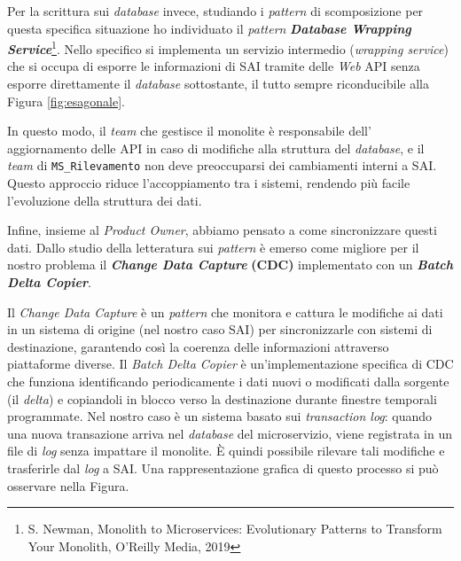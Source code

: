         \vspace{0.2 em}
        \noindent Per la scrittura sui \textit{database} invece, studiando i \textit{pattern} di scomposizione per questa specifica situazione ho individuato il \textit{pattern} \textbf{\textit{Database Wrapping Service}}\footnote{S. Newman, Monolith to Microservices: Evolutionary Patterns to Transform Your Monolith, O'Reilly Media, 2019}. Nello specifico si implementa un servizio intermedio (\textit{wrapping service}) che si occupa di esporre le informazioni di SAI tramite delle \textit{Web} API senza esporre direttamente il \textit{database} sottostante, il tutto sempre riconducibile alla Figura \ref{fig:esagonale}. 

        \vspace{0.2 em}
        \noindent In questo modo, il \textit{team} che gestisce il monolite è responsabile dell' aggiornamento delle API in caso di modifiche alla struttura del \textit{database}, e il \textit{team} di \texttt{MS\_Rilevamento} non deve preoccuparsi dei cambiamenti interni a SAI. Questo approccio riduce l'accoppiamento tra i sistemi, rendendo più facile l'evoluzione della struttura dei dati.

        \vspace{0.2 em}
        \noindent Infine, insieme al \textit{Product Owner}, abbiamo pensato a come sincronizzare questi dati. Dallo studio della letteratura sui \textit{pattern} è emerso come migliore per il nostro problema il \textit{\textbf{Change Data Capture}} \textbf{(CDC)} implementato con un \textbf{\textit{Batch Delta Copier}}. 
        
        
        \vspace{0.2 em} 
        \noindent Il \textit{Change Data Capture} è un \textit{pattern} che monitora e cattura le modifiche ai dati in un sistema di origine (nel nostro caso SAI) per sincronizzarle con sistemi di destinazione, garantendo così la coerenza delle informazioni attraverso piattaforme diverse. Il \textit{Batch Delta Copier} è un'implementazione specifica di CDC che funziona identificando periodicamente i dati nuovi o modificati dalla sorgente (il \textit{delta}) e copiandoli in blocco verso la destinazione durante finestre temporali programmate. Nel nostro caso è un sistema basato sui \textit{transaction log}: quando una nuova transazione arriva nel \textit{database} del microservizio, viene registrata in un file di \textit{log} senza impattare il monolite. È quindi possibile rilevare tali modifiche e trasferirle dal \textit{log} a SAI. Una rappresentazione grafica di questo processo si può osservare nella Figura.


